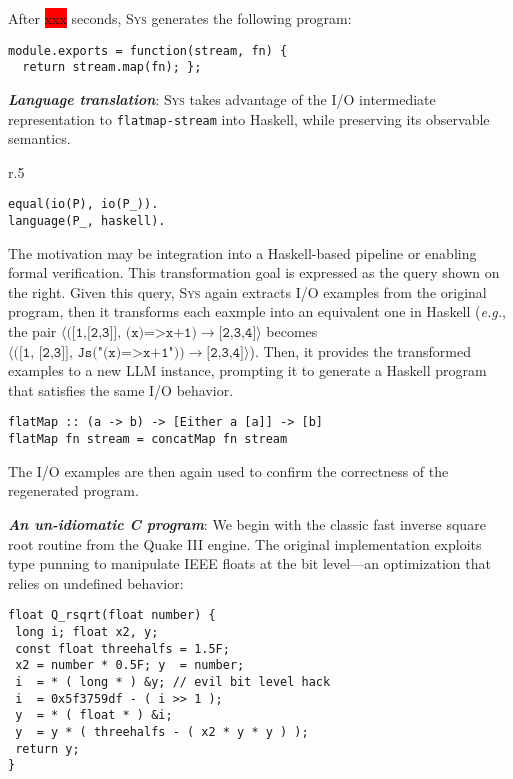 \documentclass[sigplan]{acmart}
\def\eg{{\em e.g.}, }
\newcommand{\sys}{{\scshape Sys}\xspace}
\newcommand{\heading}[1]{\vspace{2pt}\noindent\textbf{\emph{#1}}:\enspace}
\newcommand{\xxx}{\colorbox{red}{xxx}\xspace}
\begin{document}
After \xxx seconds, \sys generates the following program:
\begin{verbatim}
module.exports = function(stream, fn) {
  return stream.map(fn); };
\end{verbatim}

\heading{Language translation}
\sys takes advantage of the I/O intermediate representation to
\texttt{flatmap-stream} into Haskell, while preserving its observable
semantics.
\begin{wrapfigure}[3]{r}{.5\columnwidth}
\vspace{-10pt}
\begin{verbatim}
equal(io(P), io(P_)).
language(P_, haskell).
\end{verbatim}
\end{wrapfigure}
The motivation may be integration into a Haskell-based pipeline or
enabling formal verification.
This transformation goal is expressed as the query shown on the right.
Given this query, \sys again extracts I/O examples from the original program,
then it transforms each eaxmple into an equivalent one in Haskell (\eg 
the pair $\langle\texttt{([1,[2,3]], (x)=>x+1)}\to\texttt{[2,3,4]}\rangle$ 
becomes $\langle(\texttt{[1, [2,3]], Js("(x)=>x+1"))}\to\texttt{[2,3,4]}\rangle$).
Then, it provides the transformed examples to a new LLM instance, prompting it
to generate a Haskell program that satisfies the same I/O behavior.
\begin{verbatim}
flatMap :: (a -> b) -> [Either a [a]] -> [b]
flatMap fn stream = concatMap fn stream
\end{verbatim}
The I/O examples are then again used to confirm the correctness of the
regenerated program.

\heading{An un-idiomatic C program}
We begin with the classic fast inverse square root routine from the Quake III
engine. 
The original implementation exploits type punning to manipulate IEEE
floats at the bit level---an optimization that relies on undefined behavior:

\begin{verbatim}
float Q_rsqrt(float number) {
 long i; float x2, y;
 const float threehalfs = 1.5F;
 x2 = number * 0.5F; y  = number;
 i  = * ( long * ) &y; // evil bit level hack
 i  = 0x5f3759df - ( i >> 1 );
 y  = * ( float * ) &i;
 y  = y * ( threehalfs - ( x2 * y * y ) );
 return y;
}
\end{verbatim}
\end{document}
